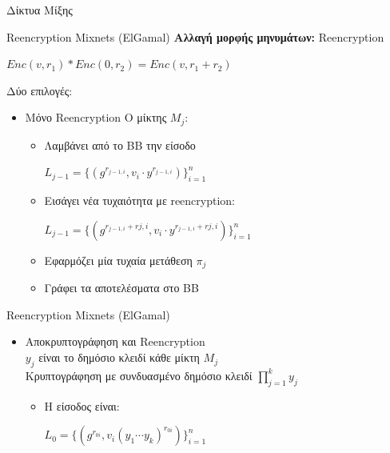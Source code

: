 \documentclass[handout]{beamer}
\begin{document}
\begin{section}{Δίκτυα Μίξης}
\begin{frame}{Reencryption Mixnets (ElGamal)}
   \textbf{ Αλλαγή μορφής μηνυμάτων:} Reencryption
   \begin{center}
    $Enc(v, r_1) * Enc(0, r_2) = Enc(v,r_1+r_2)$
   \end{center} \pause 
    Δύο επιλογές:
    \begin{itemize}
        \item Μόνο Reencryption 
         Ο μίκτης $M_j$:
        \begin{itemize}
            \item Λαμβάνει από το ΒΒ την είσοδο \begin{center} $L_{j-1} = \{ (g^{r_{j-1,i}}, v_i \cdot y^{r_{j-1,i}}) \}_{i=1}^n$  \end{center} \pause
            \item Εισάγει νέα τυχαιότητα με reencryption:
            \begin{center}$L_{j-1} =  
    	        \{ (g^{r_{j-1,i}+r{j,i}}, v_i \cdot y^{r_{j-1,i}+r{j,i}}) \}_{i=1}^n $  
            \end{center} \pause
            \item Εφαρμόζει μία τυχαία μετάθεση $\pi_j$ \pause
            \item Γράφει τα αποτελέσματα στο BB
        \end{itemize} 
   \end{itemize} 
 \end{frame}
 
 \begin{frame}{Reencryption Mixnets (ElGamal)}
   \begin{itemize}  
        
        \item Αποκρυπτογράφηση και Reencryption\\
        $y_j$ είναι το δημόσιο κλειδί κάθε μίκτη  $M_j$ \\
        Κρυπτογράφηση με συνδυασμένο δημόσιο κλειδί  $\prod_{j=1}^k y_j$ \pause
        
        \begin{itemize} 
        \item Η είσοδος είναι:
        \begin{center}$L_0 = \{ (g^{r_{0i}}, v_i (y_1 \cdots y_k)^{r_{0i}}) \}_{i=1}^n$ \end{center} \pause


\end{itemize}
\end{itemize}
\end{frame}
\end{section}
\end{document}
